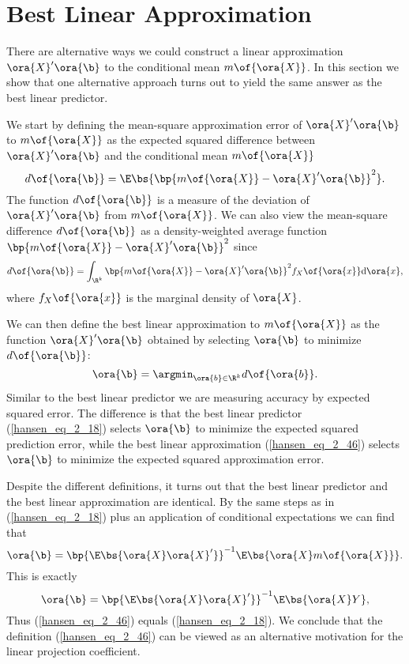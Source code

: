 \section{Best Linear Approximation}

There are alternative ways we could construct a linear approximation $\ora{X}^{\prime} \ora{\b}$ to the conditional mean $m\of{\ora{X}}$. In this section we show that one alternative approach turns out to yield the same answer as the best linear predictor.

We start by defining the mean-square approximation error of $\ora{X}^{\prime} \ora{\b}$ to $m\of{\ora{X}}$ as the expected squared difference between $\ora{X}^{\prime} \ora{\b}$ and the conditional mean $m\of{\ora{X}}$
\begin{equation}
    \notag 
    d\of{\ora{\b}} = \E\bs{\bp{m\of{\ora{X}} - \ora{X}^{\prime} \ora{\b}}^2}.
\end{equation}
The function $d\of{\ora{\b}}$ is a measure of the deviation of $\ora{X}^{\prime} \ora{\b}$ from $m\of{\ora{X}}$. We can also view the mean-square difference $d\of{\ora{\b}}$ as a density-weighted average function $\bp{m\of{\ora{X}} - \ora{X}^{\prime} \ora{\b}}^2$ since 
\begin{equation}
    \notag 
    d\of{\ora{\b}} = \int_{\R^{k}}{\bp{m\of{\ora{X}} - \ora{X}^{\prime} \ora{\b}}^2} f_X\of{\ora{x}} \mathrm{d} \ora{x},
\end{equation}
where $f_X\of{\ora{x}}$ is the marginal density of $\ora{X}$.

We can then define the best linear approximation to $m\of{\ora{X}}$ as the function $\ora{X}^{\prime}\ora{\b}$ obtained by selecting $\ora{\b}$ to minimize $d\of{\ora{\b}}$:
\begin{equation}
    \label{hansen_eq_2_46} 
    \ora{\b} = \argmin_{\ora{b} \in \R^k} d\of{\ora{b}}.
\end{equation}
Similar to the best linear predictor we are measuring accuracy by expected squared error. The difference is that the best linear predictor (\ref{hansen_eq_2_18}) selects $\ora{\b}$ to minimize the expected squared prediction error, while the best linear approximation (\ref{hansen_eq_2_46}) selects $\ora{\b}$ to minimize the expected squared approximation error.

Despite the different definitions, it turns out that the best linear predictor and the best linear approximation are identical. By the same steps as in (\ref{hansen_eq_2_18}) plus an application of conditional expectations we can find that 
\begin{equation}
    \label{hansen_eq_2_47}
    \ora{\b} = \bp{\E\bs{\ora{X}\ora{X}^{\prime}}}^{-1} \E\bs{\ora{X} m\of{\ora{X}}}.
\end{equation}
This is exactly 
\begin{equation}
    \label{hansen_eq_2_48}
    \ora{\b} = \bp{\E\bs{\ora{X}\ora{X}^{\prime}}}^{-1} \E\bs{\ora{X} Y},
\end{equation}
Thus (\ref{hansen_eq_2_46}) equals (\ref{hansen_eq_2_18}). We conclude that the definition (\ref{hansen_eq_2_46}) can be viewed as an alternative motivation for the linear projection coefficient.

